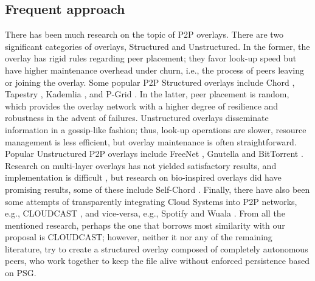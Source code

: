 \documentclass[runningheads]{llncs}
\begin{document}
\subsection
{Frequent approach}There has been much research on the topic of P2P overlays. There are two significant categories of overlays, Structured and Unstructured. In the former, the overlay has rigid rules regarding peer placement; they favor look-up speed but have higher maintenance overhead under churn, i.e., the process of peers leaving or joining the overlay. Some popular P2P Structured overlays include Chord \cite{chord}, Tapestry \cite{tapestry}, Kademlia \cite{kademlia}, and P-Grid \cite{pgrid}. In the latter, peer placement is random, which provides the overlay network with a higher degree of resilience and robustness in the advent of failures. Unstructured overlays disseminate information in a gossip-like fashion; thus, look-up operations are slower, resource management is less efficient, but overlay maintenance is often straightforward. Popular  Unstructured P2P overlays include FreeNet \cite{freenet}, Gnutella \cite{gnutella} and BitTorrent \cite{bittorrent}. Research on multi-layer overlays has not yielded satisfactory results, and implementation is difficult \cite{sotart}, but research on bio-inspired overlays did have promising results, some of these include Self-Chord \cite{selfchord}. Finally, there have also been some attempts of transparently integrating Cloud Systems into P2P networks, e.g., CLOUDCAST \cite{cloudcast}, and vice-versa, e.g., Spotify \cite{spotify} and Wuala \cite{wuala}. From all the mentioned research, perhaps the one that borrows most similarity with our proposal is CLOUDCAST; however, neither it nor any of the remaining literature, try to create a structured overlay composed of completely autonomous peers, who work together to keep the file alive without enforced persistence based on PSG.
\end{document}
